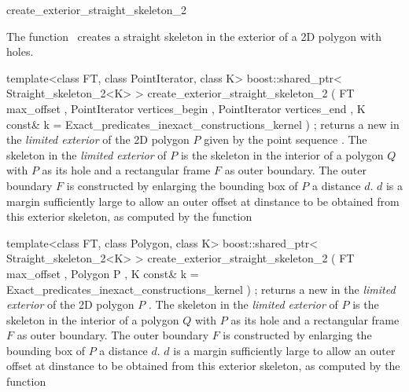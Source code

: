 

\begin{ccRefFunction}{create_exterior_straight_skeleton_2}


\ccDefinition

The function \ccRefName\ creates a straight skeleton in the exterior of a 2D polygon with holes.


\ccFunction
{template<class FT, class PointIterator, class K>
boost::shared_ptr< Straight_skeleton_2<K> >
create_exterior_straight_skeleton_2 
  ( FT            max_offset
  , PointIterator vertices_begin
  , PointIterator vertices_end
  , K const&      k = Exact_predicates_inexact_constructions_kernel
  ) ;
}
{returns a new  in the {\em limited exterior} of the 2D polygon $P$ given by the point sequence .
The skeleton in the {\em limited exterior} of $P$ is the skeleton in the interior of a polygon $Q$ with $P$ as its hole and a rectangular frame $F$ as outer boundary.
The outer boundary $F$ is constructed by enlarging the bounding box of $P$ a distance $d$. 
$d$ is a margin sufficiently large to allow an outer offset at dinstance  to be obtained from this exterior skeleton, as computed by the function  
}

\ccFunction
{template<class FT, class Polygon, class K>
boost::shared_ptr< Straight_skeleton_2<K> >
create_exterior_straight_skeleton_2 ( FT       max_offset
                                    , Polygon  P
                                    , K const& k = Exact_predicates_inexact_constructions_kernel
                                    ) ;
}
{returns a new  in the {\em limited exterior} of the 2D polygon $P$ .
The skeleton in the {\em limited exterior} of $P$ is the skeleton in the interior of a polygon $Q$ with $P$ as its hole and a rectangular frame $F$ as outer boundary.
The outer boundary $F$ is constructed by enlarging the bounding box of $P$ a distance $d$. 
$d$ is a margin sufficiently large to allow an outer offset at dinstance  to be obtained from this exterior skeleton, as computed by the function  
}


\end{ccRefFunction}

